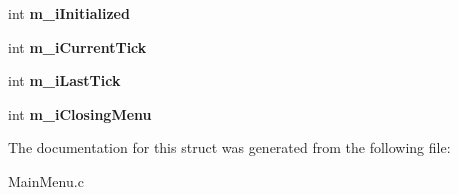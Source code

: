 \begin{DoxyCompactItemize}
int {\bfseries m\+\_\+i\+Initialized}
\item 
\mbox{\label{struct_c_main_menu_a475c7a8ac87ce2ac860cacd372882fcf}} 
int {\bfseries m\+\_\+i\+Current\+Tick}
\item 
\mbox{\label{struct_c_main_menu_acdcb97e4b7c9c4de3847e6c14e3aa71a}} 
int {\bfseries m\+\_\+i\+Last\+Tick}
\item 
\mbox{\label{struct_c_main_menu_adb94485603afd75f45c1720e4ccb1b5f}} 
int {\bfseries m\+\_\+i\+Closing\+Menu}
\end{DoxyCompactItemize}


The documentation for this struct was generated from the following file\+:\begin{DoxyCompactItemize}
\item 
Main\+Menu.\+c\end{DoxyCompactItemize}
